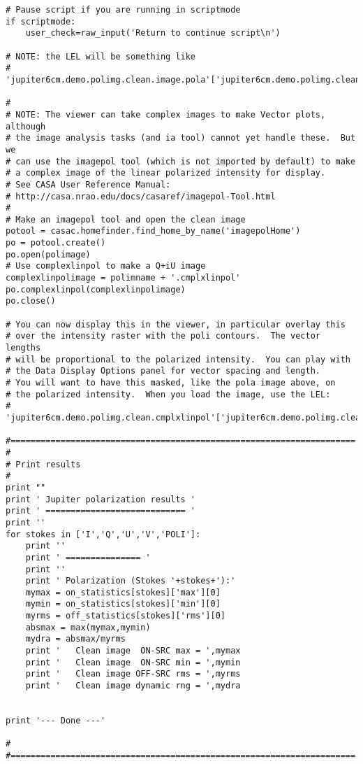 \begin{verbatim}
# Pause script if you are running in scriptmode
if scriptmode:
    user_check=raw_input('Return to continue script\n')

# NOTE: the LEL will be something like
# 'jupiter6cm.demo.polimg.clean.image.pola'['jupiter6cm.demo.polimg.clean.image.poli'>0.005]

#
# NOTE: The viewer can take complex images to make Vector plots, although
# the image analysis tasks (and ia tool) cannot yet handle these.  But we
# can use the imagepol tool (which is not imported by default) to make
# a complex image of the linear polarized intensity for display.
# See CASA User Reference Manual:
# http://casa.nrao.edu/docs/casaref/imagepol-Tool.html
#
# Make an imagepol tool and open the clean image 
potool = casac.homefinder.find_home_by_name('imagepolHome')
po = potool.create()
po.open(polimage)
# Use complexlinpol to make a Q+iU image
complexlinpolimage = polimname + '.cmplxlinpol'
po.complexlinpol(complexlinpolimage)
po.close()

# You can now display this in the viewer, in particular overlay this
# over the intensity raster with the poli contours.  The vector lengths
# will be proportional to the polarized intensity.  You can play with
# the Data Display Options panel for vector spacing and length.
# You will want to have this masked, like the pola image above, on
# the polarized intensity.  When you load the image, use the LEL:
# 'jupiter6cm.demo.polimg.clean.cmplxlinpol'['jupiter6cm.demo.polimg.clean.image.poli'>0.005]

#=====================================================================
#
# Print results
#
print ""
print ' Jupiter polarization results '
print ' ============================ '
print ''
for stokes in ['I','Q','U','V','POLI']:
    print ''
    print ' =============== '
    print ''
    print ' Polarization (Stokes '+stokes+'):'
    mymax = on_statistics[stokes]['max'][0]
    mymin = on_statistics[stokes]['min'][0]
    myrms = off_statistics[stokes]['rms'][0]
    absmax = max(mymax,mymin)
    mydra = absmax/myrms
    print '   Clean image  ON-SRC max = ',mymax
    print '   Clean image  ON-SRC min = ',mymin
    print '   Clean image OFF-SRC rms = ',myrms
    print '   Clean image dynamic rng = ',mydra


print '--- Done ---'

#
#=====================================================================
\end{verbatim}
\normalsize

